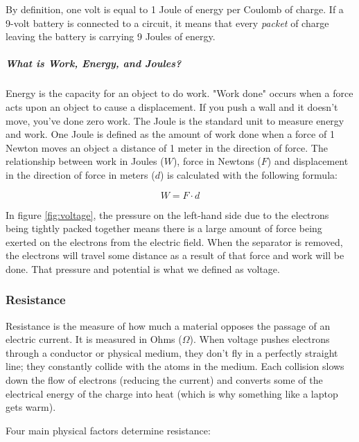 \documentclass{article}
\begin{document}
By definition, one volt is equal to 1 Joule of energy per Coulomb of charge. If a 9-volt battery is connected to a circuit, it means that every \emph{packet} of charge leaving the battery is carrying 9 Joules of energy.

\subparagraph{What is Work, Energy, and Joules?}

Energy is the capacity for an object to do work. "Work done" occurs when a force acts upon an object to cause a displacement. If you push a wall and it doesn't move, you've done zero work. The Joule is the standard unit to measure energy and work. One Joule is defined as the amount of work done when a force of 1 Newton moves an object a distance of 1 meter in the direction of force. The relationship between work in Joules ($W$), force in Newtons ($F$) and displacement in the direction of force in meters ($d$) is calculated with the following formula:

$$W = F \cdot d$$

In figure \ref{fig:voltage}, the pressure on the left-hand side due to the electrons being tightly packed together means there is a large amount of force being exerted on the electrons from the electric field. When the separator is removed, the electrons will travel some distance as a result of that force and work will be done. That pressure and potential is what we defined as voltage.

\subsubsection{Resistance}

Resistance is the measure of how much a material opposes the passage of an electric current. It is measured in Ohms ($\Omega$). When voltage pushes electrons through a conductor or physical medium, they don't fly in a perfectly straight line; they constantly collide with the atoms in the medium. Each collision slows down the flow of electrons (reducing the current) and converts some of the electrical energy of the charge into heat (which is why something like a laptop gets warm).

Four main physical factors determine resistance:
\end{document}
